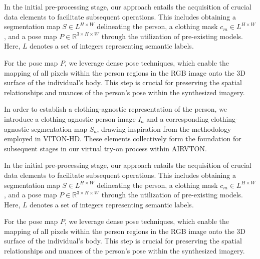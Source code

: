     In the initial pre-processing stage, our approach entails the acquisition of crucial data elements to facilitate subsequent operations. This includes obtaining a segmentation map \( S \in L^{H \times W} \) delineating the person, a clothing mask \( c_m \in L^{H \times W} \), and a pose map \( P \in \mathbb{R}^{3 \times H \times W} \) through the utilization of pre-existing models. Here, \( L \) denotes a set of integers representing semantic labels.

    For the pose map \( P \), we leverage dense pose techniques, which enable the mapping of all pixels within the person regions in the RGB image onto the 3D surface of the individual's body. This step is crucial for preserving the spatial relationships and nuances of the person's pose within the synthesized imagery.

    In order to establish a clothing-agnostic representation of the person, we introduce a clothing-agnostic person image \( I_a \) and a corresponding clothing-agnostic segmentation map \( S_a \), drawing inspiration from the methodology employed in VITON-HD. These elements collectively form the foundation for subsequent stages in our virtual try-on process within AIRVTON.

    In the initial pre-processing stage, our approach entails the acquisition of crucial data elements to facilitate subsequent operations. This includes obtaining a segmentation map \( S \in L^{H \times W} \) delineating the person, a clothing mask \( c_m \in L^{H \times W} \), and a pose map \( P \in \mathbb{R}^{3 \times H \times W} \) through the utilization of pre-existing models. Here, \( L \) denotes a set of integers representing semantic labels.

    For the pose map \( P \), we leverage dense pose techniques, which enable the mapping of all pixels within the person regions in the RGB image onto the 3D surface of the individual's body. This step is crucial for preserving the spatial relationships and nuances of the person's pose within the synthesized imagery.

